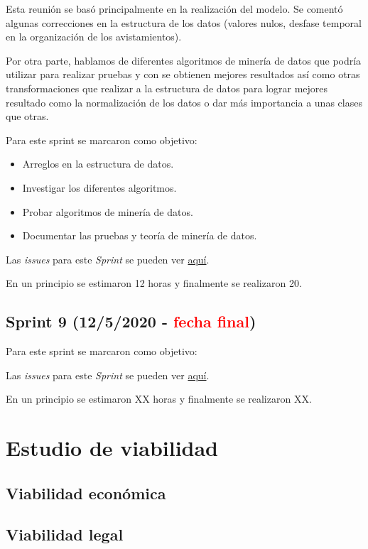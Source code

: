 Esta reunión se basó principalmente en la realización del modelo. Se comentó algunas correcciones en la estructura de los datos (valores nulos, desfase temporal en la organización de los avistamientos).

Por otra parte, hablamos de diferentes algoritmos de minería de datos que podría utilizar para realizar pruebas y con se obtienen mejores resultados así como otras transformaciones que realizar a la estructura de datos para lograr mejores resultado como la normalización de los datos o dar más importancia a unas clases que otras.

Para este sprint se marcaron como objetivo:
\begin{itemize}
	\item Arreglos en la estructura de datos.
	\item Investigar los diferentes algoritmos.
	\item Probar algoritmos de minería de datos.
	\item Documentar las pruebas y teoría de minería de datos.
\end{itemize} 

Las \emph{issues} para este \emph{Sprint} se pueden ver \href{https://github.com/psnti/TFG-Pablo-Santidrian-Tudanca/milestone/8}{aquí}.


En un principio se estimaron 12 horas y finalmente se realizaron 20.

\subsection{Sprint 9 (12/5/2020 - \textcolor{red}{fecha final})}\label{Sprint-5}



Para este sprint se marcaron como objetivo:
\begin{itemize}
	
\end{itemize} 

Las \emph{issues} para este \emph{Sprint} se pueden ver \href{https://github.com/psnti/TFG-Pablo-Santidrian-Tudanca/milestone/9}{aquí}.


En un principio se estimaron XX horas y finalmente se realizaron XX.

\section{Estudio de viabilidad}

\subsection{Viabilidad económica}

\subsection{Viabilidad legal}


